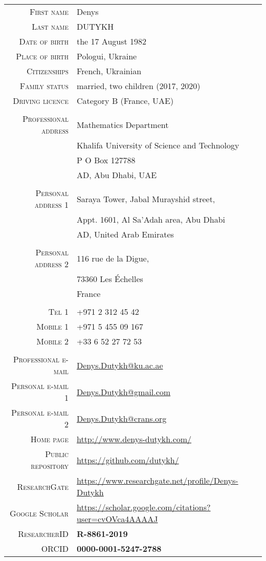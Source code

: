 \documentclass[final, a4paper, oneside, 12pt]{article}
\numberwithin{equation}{section}
\begin{document}
    \begin{tabular}{rl}
      \textsc{First name} & Denys \\
      \textsc{Last name} & \textsc{DUTYKH} \\
      \textsc{Date of birth} & the 17\up{th} August 1982 \\
      \textsc{Place of birth} & Pologui, Ukraine \\
      \textsc{Citizenships} & French, Ukrainian \\
      \textsc{Family status} & married, two children (2017, 2020) \\
      \textsc{Driving licence} & Category B (France, UAE) \\
      & \\
      \textsc{Professional address} & Mathematics Department \\
      & Khalifa University of Science and Technology \\
      & P O Box 127788 \\
      & AD, Abu Dhabi, UAE \\
      & \\
      \textsc{Personal address 1} & Saraya Tower, Jabal Murayshid street, \\
      & Appt. 1601, Al Sa'Adah area, Abu Dhabi \\
      & AD, United Arab Emirates \\
      & \\
      \textsc{Personal address 2} & 116 rue de la Digue, \\
      & 73360 Les \'Echelles \\
      & France \\
      & \\
      \textsc{Tel 1} &    +971 2  312 45 42 \\
      \textsc{Mobile 1} & +971 5  455 09 167 \\
      \textsc{Mobile 2} & +33  6  52 27 72 53 \\
      & \\
      \textsc{Professional e-mail} &
       \href{mailto:Denys.Dutykh@ku.ac.ae}{Denys.Dutykh@ku.ac.ae} \\
      \textsc{Personal e-mail 1} &
       \href{mailto:Denys.Dutykh@gmail.com}{Denys.Dutykh@gmail.com} \\
      \textsc{Personal e-mail 2} &
       \href{mailto:Denys.Dutykh@crans.org}{Denys.Dutykh@crans.org} \\
      \textsc{Home page} & \url{http://www.denys-dutykh.com/} \\
      \textsc{Public repository} & \url{https://github.com/dutykh/} \\
      \textsc{ResearchGate} & \url{https://www.researchgate.net/profile/Denys-Dutykh} \\
      \textsc{Google Scholar} & \url{https://scholar.google.com/citations?user=cvOVca4AAAAJ} \\
      \textsc{ResearcherID} & \textbf{R-8861-2019} \\
      \textsc{ORCID} & \textbf{0000-0001-5247-2788} \\
    \end{tabular}
    
\end{document}
